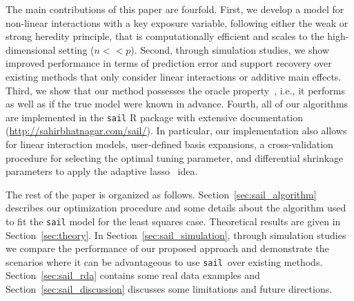 \documentclass[12pt,letter]{article}\usepackage[]{graphicx}\usepackage[]{color}
\newcommand{\sail}{\texttt{sail}}
\begin{document}
The main contributions of this paper are fourfold.
First, we develop a model for non-linear interactions with a key exposure variable, following either the weak or strong heredity principle, that is computationally efficient and scales to the high-dimensional setting ($n << p$).
Second, through simulation studies, we show improved performance in terms of prediction error and support recovery over existing methods that only consider linear interactions or additive main effects.
Third, we show that our method possesses the oracle property~\citep{fan2001variable}, i.e., it performs as well as if the true model were known in advance.
Fourth, all of our algorithms are implemented in the \texttt{sail} R package with extensive documentation (\url{http://sahirbhatnagar.com/sail/}). In particular, our implementation also allows for linear interaction models, user-defined basis expansions, a cross-validation procedure for selecting the optimal tuning parameter, and differential shrinkage parameters to apply the adaptive lasso~\citep{zou2006adaptive} idea.

The rest of the paper is organized as follows. Section~\ref{sec:sail_algorithm} describes our optimization procedure and some details about the algorithm used to fit the \texttt{sail} model for the least squares case. Theoretical results are given in Section~\ref{sec:theory}. In Section~\ref{sec:sail_simulation}, through simulation studies we compare the performance of our proposed approach and demonstrate the scenarios where it can be advantageous to use \sail ~over existing methods. Section~\ref{sec:sail_rda} contains some real data examples and Section~\ref{sec:sail_discussion} discusses some limitations and future directions.
\end{document}
